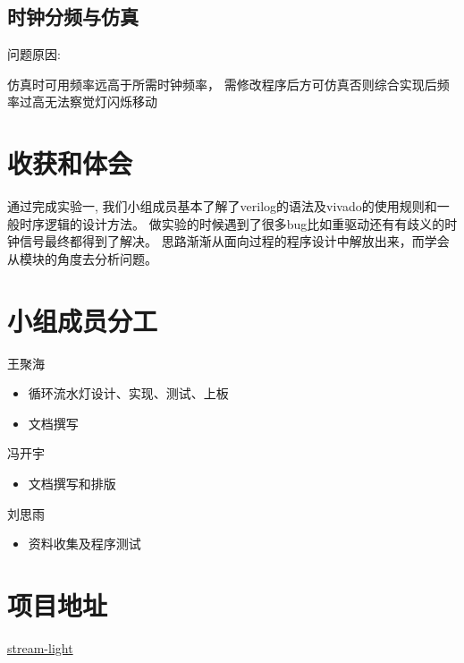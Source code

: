 \documentclass[UTF8]{article}
\begin{document}
\subsection{时钟分频与仿真}
问题原因: 

仿真时可用频率远高于所需时钟频率，
需修改程序后方可仿真否则综合实现后频率过高无法察觉灯闪烁移动

\section{收获和体会}

通过完成实验一,
 我们小组成员基本了解了verilog的语法及vivado的使用规则和一般时序逻辑的设计方法。
 做实验的时候遇到了很多bug比如重驱动还有有歧义的时钟信号最终都得到了解决。
  思路渐渐从面向过程的程序设计中解放出来，而学会从模块的角度去分析问题。  

\section{小组成员分工}

王聚海
\begin{itemize}
    \item 循环流水灯设计、实现、测试、上板
    \item 文档撰写
\end{itemize}

冯开宇
\begin{itemize}
    \item 文档撰写和排版
\end{itemize}

刘思雨
\begin{itemize}
    \item 资料收集及程序测试
\end{itemize}



\section{项目地址}

\href{https://github.com/bit-logic-computer-design-2019/stream-light}{stream-light}
\end{document}
